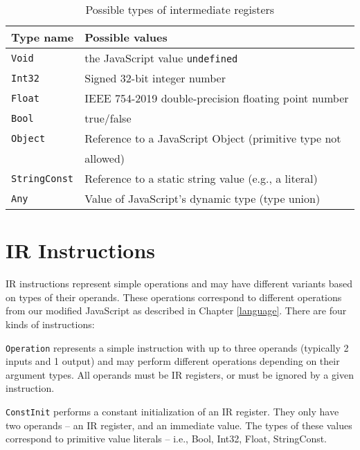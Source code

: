 \begin{table}[H]
    \centering
    \begin{tabular}{l | l}
        Type name            & Possible values                                                \\\hline
        \texttt{Void}        & the JavaScript value \texttt{undefined}                        \\
        \texttt{Int32}       & Signed 32-bit integer number                                   \\
        \texttt{Float}       & IEEE 754-2019 double-precision floating point number           \\
        \texttt{Bool}        & true/false                                                     \\
        \texttt{Object}      & Reference to a JavaScript Object (primitive type not           \\
                             & allowed)  \\
        \texttt{StringConst} & Reference to a static string value (e.g., a literal)           \\
        \texttt{Any}         & Value of JavaScript's dynamic type (type union)
    \end{tabular}
    \caption{Possible types of intermediate registers}
    \label{tab:types}
\end{table}


\section{IR Instructions}

IR instructions represent simple operations and may have different variants based on types of their operands. These operations correspond to different operations from our modified JavaScript as described in Chapter \ref{language}. There are four kinds of instructions:


\texttt{Operation} represents a simple instruction with up to three operands (typically 2 inputs and 1 output) and may perform different operations depending on their argument types. All operands must be IR registers, or must be ignored by a given instruction.

\texttt{ConstInit} performs a constant initialization of an IR register. They only have two operands -- an IR register, and an immediate value. The types of these values correspond to primitive value literals -- i.e., Bool, Int32, Float, StringConst.

